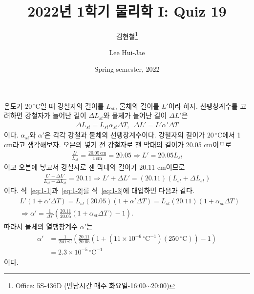 \documentclass[floatfix,nofootinbib,superscriptaddress,fleqn]{revtex4-2}
\begin{document}
\title{\Large 2022년 1학기 물리학 I: Quiz 19}
\author{김현철\footnote{Office: 5S-436D (면담시간 매주
    화요일-16:00$\sim$20:00)}} 
\author{Lee Hui-Jae} 
\date{Spring semester, 2022}


\vspace{1.cm}

\maketitle


온도가 $20\,\mathrm{^\circ C}$일 때 강철자의 길이를 $L_{st}$,
물체의 길이를 $L'$이라 하자.
선팽창계수를 고려하면 강철자가 늘어난 길이 $\Delta L_{st}$와
물체가 늘어난 길이 $\Delta L'$은
\begin{align}\label{eq:1-1}
  \Delta L_{st} =L_{st}\alpha_{st}\Delta T,\,\,\,
  \Delta L' =L'\alpha'\Delta T
\end{align}
이다. $\alpha_{st}$와 $\alpha'$은 각각 강철과 물체의 선팽창계수이다. 
강철자의 길이가 $20\,\mathrm{^\circ C}$에서 1 cm라고 생각해보자. 
오븐의 넣기 전 강철자로 잰 막대의 길이가 20.05 cm이므로
\begin{align}\label{eq:1-2}
  \frac{L'}{L_{st}} = \frac{20.05\,\mathrm{cm}}{1\,\mathrm{cm}}
  =20.05 \Longrightarrow L' = 20.05 L_{st}
\end{align}
이고 오븐에 넣고서 강철자로 잰 막대의 길이가 20.11 cm이므로
\begin{align}\label{eq:1-3}
  \frac{L'+\Delta L'}{L_{st}+\Delta L_{st}} = 20.11
  \Longrightarrow 
  L'+\Delta L' = (20.11)(L_{st}+\Delta L_{st})
\end{align}
이다. 식~\eqref{eq:1-1}과~\eqref{eq:1-2}를 식~\eqref{eq:1-3}에 대입하면
다음과 같다.
\begin{align}
  \begin{split}
    &L'(1+\alpha'\Delta T) = L_{st}(20.05)(1+\alpha'\Delta T)
    = L_{st}(20.11)(1+\alpha_{st}\Delta T)  \\
    &\Longrightarrow \alpha' = \frac{1}{\Delta T}\left(\frac{20.11}{20.05}
    (1+\alpha_{st}\Delta T)-1\right).
  \end{split}
\end{align}
따라서 물체의 열팽창계수 $\alpha'$는
\begin{align}
  \begin{split}
    \alpha' &= \frac{1}{250\,\mathrm{^\circ C}}\left(\frac{20.11}{20.05}
    \left(1+(11\times 10^{-6}\,\mathrm{^\circ C^{-1}})
    (250\,\mathrm{^\circ C})\right)-1\right)  \\
    &=2.3\times 10^{-5}\,\mathrm{^\circ C^{-1}}
  \end{split}
\end{align}
이다.
\end{document}
